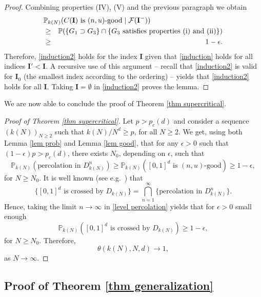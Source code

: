 \documentclass[11pt,a4paper]{article}
\newcommand{\Ib}{\ensuremath{\mathbf{I}}}
\newcommand{\pc}{\ensuremath{p_{c}(d)}}
\newcommand{\IP}{\ensuremath{\mathbb{P}}}
\newcommand{\FF}{\ensuremath{\mathcal{F}}}
\theoremstyle{remark}
\begin{document}
\begin{proof}
Combining properties (IV), (V) and the previous paragraph we obtain
\begin{eqnarray*}
 \lefteqn{\IP_{k(N)}(C(\Ib) \text{ is } (n,u)\text{-good} \mid \FF(\Ib^-))} \\
& \geq& \IP(\{G_1 \supset G_3 \} \cap \{G_3 \text{ satisfies properties (i) and (ii)}\}) \\
&\geq& 1-\epsilon.
\end{eqnarray*}
Therefore, \eqref{induction2} holds for the index $\Ib$ given that \eqref{induction} holds for all indices $\Ib'<\Ib$. A recursive use of this argument -- recall that \eqref{induction2} is valid for $\Ib_0$ (the smallest index according to the ordering) -- yields that \eqref{induction2} holds for all $\Ib$. Taking $\Ib=\emptyset$ in \eqref{induction2} proves the lemma.
\end{proof}


We are now able to conclude the proof of Theorem \ref{thm supercritical}.


\begin{proof}[Proof of Theorem \ref{thm supercritical}]
Let $p>\pc$ and consider a sequence $(k(N))_{N \geq 2}$ such that $k(N)/N^d \geq p$, for all $N \geq 2$. We get, using both Lemma \ref{lem prob} and Lemma \ref{lem good}, that for any $\epsilon >0$ such that $(1-\epsilon)p > \pc$, there exists $N_0$, depending on $\epsilon$, such that
\begin{equation}\label{level percolation}
 \IP_{k(N)}(\text{percolation in } D^n_{k(N)}) \geq \IP_{k(N)}([0,1]^d \text{ is } (n,u)\text{-good}) \geq 1-\epsilon,
\end{equation}
for $N \geq N_0$. It is well known (see e.g.\ \cite{FalGri}) that
\[
 \{[0,1]^d \text{ is crossed by } D_{k(N)} \} = \bigcap_{n=1}^{\infty} \{\text{percolation in } D^n_{k(N)}\}. 
\]
Hence, taking the limit $n\to \infty$ in \eqref{level percolation} yields that for $\epsilon > 0$ small enough
\begin{equation}\label{final percolation}
 \IP_{k(N)}([0,1]^d \text{ is crossed by } D_{k(N)}) \geq 1-\epsilon,
\end{equation}
for $N \geq N_0$. Therefore, 
\[
 \theta(k(N),N,d) \to 1,
\]
as $N\to \infty$.
\end{proof}







\subsection{Proof of Theorem \ref{thm generalization}}\label{sec generalization}
\end{document}
